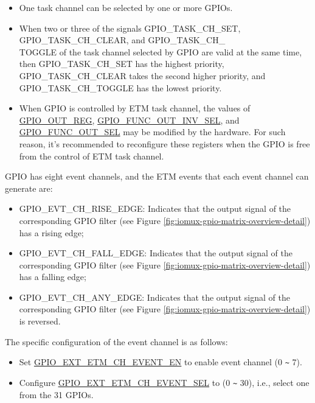 \documentclass[main\_\_EN.tex]{subfiles}
\begin{document}
\begin{tiplisting}
\vspace{-2em}
\begin{itemize}
\item One task channel can be selected by one or more GPIOs.

\item When two or three of the signals GPIO\_TASK\_CH\_SET, GPIO\_TASK\_CH\_CLEAR, and GPIO\_TASK\_CH\_\\TOGGLE of the task channel   selected by GPIO are valid at the same time, then GPIO\_TASK\_CH\_SET has the highest priority, GPIO\_TASK\_CH\_CLEAR takes the second higher priority, and GPIO\_TASK\_CH\_TOGGLE has the lowest priority.

\item When GPIO is controlled by ETM task channel, the values of \hyperref[regdesc:GPIOOUTREG]{GPIO\_OUT\_REG}, \hyperref[fielddesc:GPIOFUNCNOUTINVSEL]{GPIO\_FUNC\_OUT\_INV\_SEL}, and \hyperref[fielddesc:GPIOFUNCNOUTSEL]{GPIO\_FUNC\_OUT\_SEL} may be modified by the hardware. For such reason, it's recommended to reconfigure these registers when the GPIO is free from the control of ETM task channel.
\end{itemize}
\end{tiplisting}

GPIO has eight event channels, and the ETM events that each event channel can generate are:

\begin{itemize}
    \item GPIO\_EVT\_CH\_RISE\_EDGE: Indicates that the output signal of the corresponding GPIO filter (see Figure \ref{fig:iomux-gpio-matrix-overview-detail}) has a rising edge;
    \item GPIO\_EVT\_CH\_FALL\_EDGE: Indicates that the output signal of the corresponding GPIO filter (see Figure \ref{fig:iomux-gpio-matrix-overview-detail}) has a falling edge;
    \item GPIO\_EVT\_CH\_ANY\_EDGE: Indicates that the output signal of the corresponding GPIO filter (see Figure \ref{fig:iomux-gpio-matrix-overview-detail}) is reversed.
\end{itemize}

The specific configuration of the event channel is as follows:

\begin{itemize}
    \item Set  \hyperref[fielddesc:GPIOSDETMCH0EVENTEN]{GPIO\_EXT\_ETM\_CH\_EVENT\_EN} to enable event channel  (0 \verb+~+ 7).
    \item Configure \hyperref[fielddesc:GPIOSDETMCH0EVENTSEL]{GPIO\_EXT\_ETM\_CH\_EVENT\_SEL} to  (0 \verb+~+ 30), i.e., select one from the 31 GPIOs.
\end{itemize}
\end{document}
